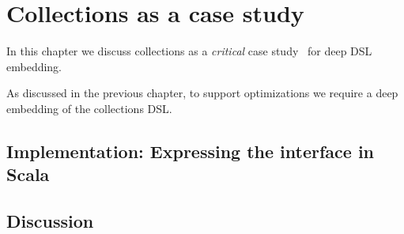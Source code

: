 \chapter{Collections as a case study}
\label{sec:caseStudy}
In this chapter we discuss collections as a \emph{critical} case
study~\citep{flyvbjerg06five} for deep DSL embedding.

As discussed in the previous chapter, to support optimizations we require a deep embedding of the collections DSL\@.



\section{Implementation: Expressing the interface in Scala}
\label{sec:intfScala}


\section{Discussion}
\label{sec:discussion}



